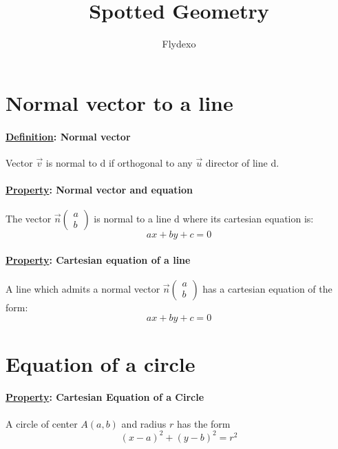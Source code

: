 \documentclass{article}
\title{Spotted Geometry}
\author{Flydexo}
\newcommand{\definition}[1]{\paragraph*{\underline{Definition}: #1}}
\newcommand{\property}[1]{\paragraph*{\underline{Property}: #1}}
\renewcommand{\vec}[1]{\overrightarrow{#1}}
\newcommand{\twodivec}[3]{\vec{#1} \begin{pmatrix}#2 \\ #3\end{pmatrix}}
\begin{document}
\maketitle
\section{Normal vector to a line}
\definition{Normal vector}
Vector $\vec{v}$ is normal to d if orthogonal to any $\vec{u}$ director of line d.
\property{Normal vector and equation}
The vector $\twodivec{n}{a}{b}$ is normal to a line d where its cartesian equation is:$$ax + by + c = 0$$
\property{Cartesian equation of a line}
A line which admits a normal vector $\twodivec{n}{a}{b}$ has a cartesian equation of the form:$$ax + by + c = 0$$
\section{Equation of a circle}
\property{Cartesian Equation of a Circle}
A circle of center $A(a, b)$ and radius $r$ has the form $$(x-a)^2+(y-b)^2 = r^2$$
\end{document}
